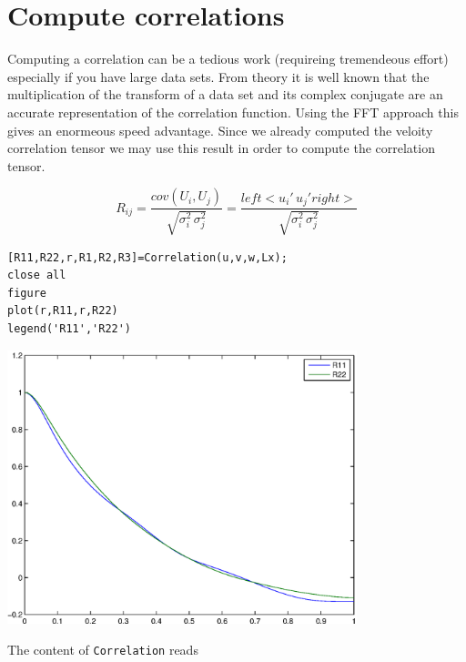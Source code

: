 \documentclass[preprint,12pt,ntfdMod]{elsarticle}
\begin{document}
\section{Compute correlations}

\begin{par}
Computing a correlation can be a tedious work (requireing tremendeous effort) especially if you have large data sets. From theory it is well known that the multiplication of the transform of a data set and its complex conjugate are an accurate representation of the correlation function. Using the FFT approach this gives an enormeous speed advantage. Since we already computed the veloity correlation tensor we may use this result in order to compute the correlation tensor.
\end{par} \vspace{1em}
\begin{par}

  \begin{equation}
      R_{ij} = \frac{cov(U_i,U_j)}{\sqrt{\sigma_i^2\,\sigma_j^2}}
             = \frac{left<u_i'\,u_j'right>}{\sqrt{\sigma_i^2\,\sigma_j^2}}
  \end{equation}

\end{par} \vspace{1em}
\begin{lstlisting}
[R11,R22,r,R1,R2,R3]=Correlation(u,v,w,Lx);
close all
figure
plot(r,R11,r,R22)
legend('R11','R22')
\end{lstlisting}

\includegraphics [width=4in]{spectrum_3d_02.eps}
\begin{par}

The content of \verb|Correlation| reads


\end{par} \vspace{1em}
\end{document}
